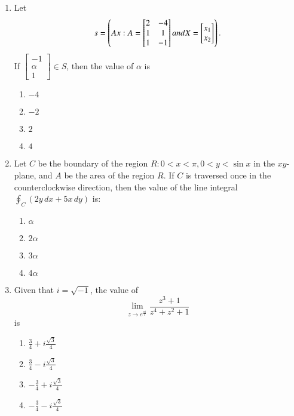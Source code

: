 \documentclass[journal,12pt,onecolumn]{IEEEtran}
\theoremstyle{remark}
\begin{document}
\begin{enumerate}
    \item Let 
    $$s = \left(A x : A = \begin{bmatrix} 2 & -4 \\ 1 & 1 \\ 1 & -1 \end{bmatrix} and X = \begin{bmatrix} x_1 \\ x_2 \end{bmatrix}\right).$$
    If $\begin{bmatrix}
        -1\\\alpha\\1
    \end{bmatrix} \in S$, then the value of $\alpha$ is
    \begin{enumerate}
        \item $-4$
        \item $-2$
        \item $2$
        \item $4$
    \end{enumerate}

    \item Let $C$ be the boundary of the region $R: 0 < x < \pi, 0 < y < \sin x$ in the $xy$-plane, and $A$ be the area of the region $R$. If $C$ is traversed once in the counterclockwise direction, then the value of the line integral $\oint_C (2y \, dx + 5x \, dy)$ is:
    \begin{enumerate}
        \item $\alpha$
        \item $2\alpha$
        \item $3\alpha$
        \item $4\alpha$
    \end{enumerate}

    \item Given that $i = \sqrt{-1}$, the value of 
    $$\lim_{z \to e^\frac{{\pi}i}{3}} \frac{z^3 + 1}{z^4+z^2 + 1}$$ is
    \begin{enumerate}
        \item $\frac{3}{4} + i \frac{\sqrt{3}}{4}$
        \item $\frac{3}{4} - i \frac{\sqrt{3}}{4}$
        \item $-\frac{3}{4} + i \frac{\sqrt{3}}{4}$
        \item $-\frac{3}{4} - i \frac{\sqrt{3}}{4}$

    \end{enumerate}
\end{enumerate}
\end{document}
